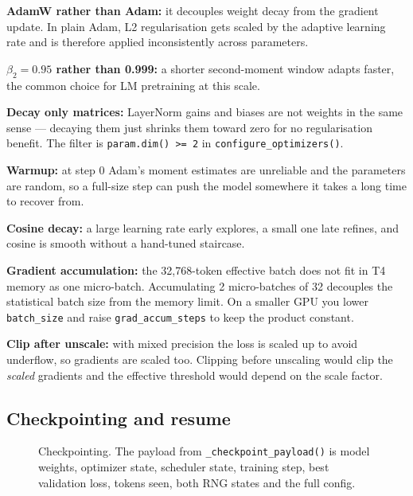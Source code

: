 \documentclass[11pt]{report}
\begin{document}
\begin{deeper}
\textbf{AdamW rather than Adam:} it decouples weight decay from the gradient
update. In plain Adam, L2 regularisation gets scaled by the adaptive learning
rate and is therefore applied inconsistently across parameters.

\smallskip
\textbf{$\beta_2 = 0.95$ rather than 0.999:} a shorter second-moment window
adapts faster, the common choice for LM pretraining at this scale.

\smallskip
\textbf{Decay only matrices:} LayerNorm gains and biases are not weights in the
same sense --- decaying them just shrinks them toward zero for no regularisation
benefit. The filter is \texttt{param.dim() >= 2} in
\texttt{configure\_optimizers()}.

\smallskip
\textbf{Warmup:} at step 0 Adam's moment estimates are unreliable and the
parameters are random, so a full-size step can push the model somewhere it
takes a long time to recover from.

\smallskip
\textbf{Cosine decay:} a large learning rate early explores, a small one late
refines, and cosine is smooth without a hand-tuned staircase.

\smallskip
\textbf{Gradient accumulation:} the 32,768-token effective batch does not fit in
T4 memory as one micro-batch. Accumulating 2 micro-batches of 32 decouples the
statistical batch size from the memory limit. On a smaller GPU you lower
\texttt{batch\_size} and raise \texttt{grad\_accum\_steps} to keep the product
constant.

\smallskip
\textbf{Clip after unscale:} with mixed precision the loss is scaled up to avoid
underflow, so gradients are scaled too. Clipping before unscaling would clip
the \emph{scaled} gradients and the effective threshold would depend on the
scale factor.
\end{deeper}

\subsection{Checkpointing and resume}

\begin{figure}[htbp]
\centering
{}
\caption{Checkpointing. The payload from \texttt{\_checkpoint\_payload()} is
model weights, optimizer state, scheduler state, training step, best validation
loss, tokens seen, both RNG states and the full config.}
\end{figure}
\end{document}
